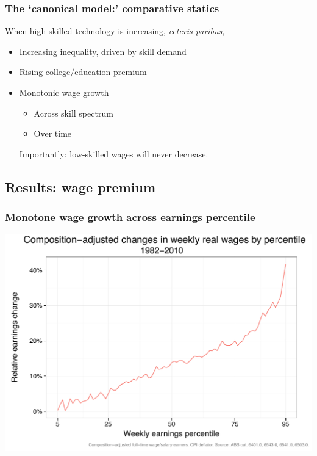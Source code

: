 \documentclass[red]{beamer}
\newcommand{\vitem}{\vfill\item}
\begin{document}
\begin{frame}
\frametitle{The `canonical model:' comparative statics}
When high-skilled technology is increasing, {\em ceteris paribus},
  \begin{itemize}
  \vitem Increasing inequality, driven by skill demand
  \vitem Rising college/education premium
  \vitem Monotonic wage growth
  \begin{itemize}
    \vitem Across skill spectrum
    \vitem Over time
  \end{itemize}
  
  Importantly: low-skilled wages will never decrease.
  \end{itemize}
\end{frame}

\subsection{Results: wage premium}
\begin{frame}[c]
\frametitle{Monotone wage growth across earnings percentile}
\begin{center}
  \includegraphics[width=\textwidth]{slides_fig/quantile_growth_percent.pdf}
\end{center}
\end{frame}
\end{document}
